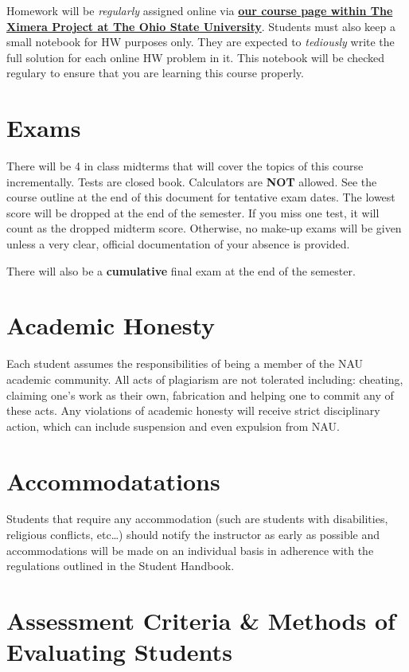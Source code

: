\documentclass[handout]{ximera}
\begin{document}
Homework will be {\it regularly} assigned online via \href{http://ximera.osu.edu/course/oguzkurt/PreAlgebraCourse}{\bf our course page within The Ximera Project at The Ohio State University}. Students must also keep a small notebook for HW purposes only. They are expected to {\it tediously} write the full solution for each online HW problem in it. This notebook will be checked regulary to ensure that you are learning this course properly. 

\section*{Exams}

There will be 4 in class midterms that will cover the topics of this course incrementally. Tests are closed book. Calculators are {\bf NOT} allowed. See the course outline at the end of this document for tentative exam dates. The lowest score will be dropped at the end of the semester. If you miss one test, it will count as the dropped midterm score. Otherwise, no make-up exams will be given unless a very clear, official documentation of your absence is provided.

There will also be a {\bf cumulative} final exam at the end of the semester.

\section*{Academic Honesty}

Each student assumes the responsibilities of being a member of the NAU academic community.  All acts of plagiarism are not tolerated including: cheating, claiming one’s work as their own, fabrication and helping one to commit any of these acts.  Any violations of academic honesty will receive strict disciplinary action, which can include suspension and even expulsion from NAU.  

\section*{Accommodatations}

Students that require any accommodation (such are students with disabilities, religious conflicts, etc…) should notify the instructor as early as possible and accommodations will be made on an individual basis in adherence with the regulations outlined in the Student Handbook.

\section*{Assessment Criteria \& Methods of Evaluating Students}
\end{document}
